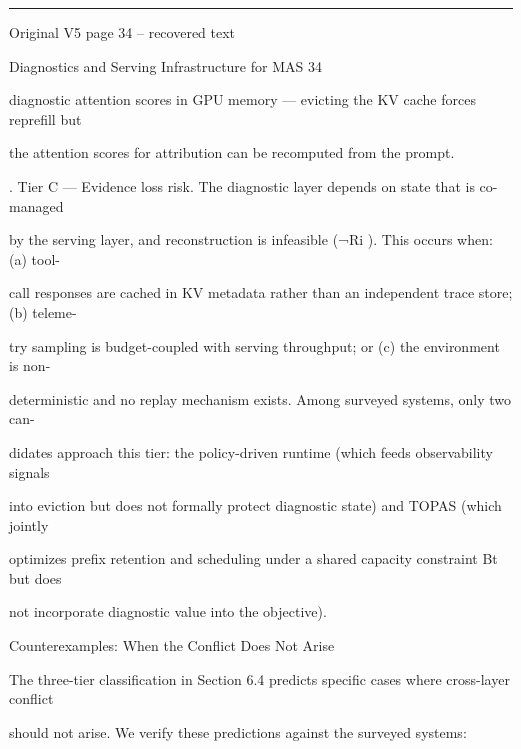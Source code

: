 \par\smallskip\noindent\rule{\textwidth}{0.4pt}\par{\sffamily\footnotesize Original V5 page 34 -- recovered text}\par\begin{flushleft}\footnotesize\ttfamily
\par\smallskip
\par\smallskip
\noindent Diagnostics and Serving Infrastructure for MAS 34\par
\par\smallskip
\par\smallskip
\par\smallskip
\noindent  diagnostic attention scores in GPU memory — evicting the KV cache forces reprefill but\par
\noindent  the attention scores for attribution can be recomputed from the prompt.\par
{}. Tier C — Evidence loss risk. The diagnostic layer depends on state that is co-managed\par
\noindent  by the serving layer, and reconstruction is infeasible (¬Ri ). This occurs when: (a) tool-\par
\noindent  call responses are cached in KV metadata rather than an independent trace store; (b) teleme-\par
\noindent  try sampling is budget-coupled with serving throughput; or (c) the environment is non-\par
\noindent  deterministic and no replay mechanism exists. Among surveyed systems, only two can-\par
\noindent  didates approach this tier: the policy-driven runtime (which feeds observability signals\par
\noindent  into eviction but does not formally protect diagnostic state) and TOPAS (which jointly\par
\noindent  optimizes prefix retention and scheduling under a shared capacity constraint Bt but does\par
\noindent  not incorporate diagnostic value into the objective).\par
\par\smallskip
{} Counterexamples: When the Conflict Does Not Arise\par
\noindent The three-tier classification in Section 6.4 predicts specific cases where cross-layer conflict\par
\noindent should not arise. We verify these predictions against the surveyed systems:\par

\end{flushleft}
